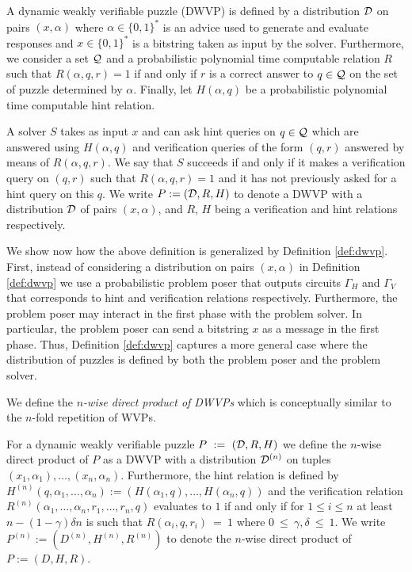 \begin{definition}
  \label{def:dwvp_dodis}
  A \textnormal{dynamic weakly verifiable puzzle} (DWVP) is defined by a distribution $\mathcal{D}$ on pairs $(x, \alpha)$
  where $\alpha \in \{0,1\}^{*}$ is an advice used to generate and evaluate responses and $x \in \{0,1\}^{*}$ is
  a bitstring taken as input by the solver.
  Furthermore, we consider a set $\mathcal{Q}$ and a probabilistic polynomial time computable relation $R$ such that
  $R(\alpha, q, r) = 1$ if and only if $r$ is a correct answer to $q \in \mathcal{Q}$ on the set of puzzle determined by $\alpha$.
  Finally, let $H(\alpha, q)$ be a probabilistic polynomial time computable \textnormal{hint} relation.

  A solver $S$ takes as input $x$ and can ask hint queries on $q \in \mathcal{Q}$ which are answered using $H(\alpha, q)$ and verification
  queries of the form $(q,r)$ answered by means of $R(\alpha, q, r)$.
  We say that $S$ succeeds if and only if it makes a verification query on $(q,r)$ such that
  $R(\alpha,q,r) = 1$ and it
  has not previously asked for a hint query on this $q$. We write $P := (\mathcal{D}, R, H)$ to denote a DWVP with a distribution
  $\mathcal{D}$ of pairs $(x, \alpha)$, and $R$, $H$ being a verification and hint relations respectively.
\end{definition}
%
We show now how the above definition is generalized by Definition \ref{def:dwvp}.
First, instead of considering a distribution on pairs $(x,\alpha)$ in Definition \ref{def:dwvp}
we use a probabilistic problem poser that outputs circuits $\Gamma_H$ and $\Gamma_V$ that corresponds to hint
and verification relations respectively.
Furthermore, the problem poser may interact in the first phase with the problem solver.
In particular, the problem poser can send a bitstring $x$ as a message in the first phase.
Thus, Definition \ref{def:dwvp} captures a more general case where the distribution of
puzzles is defined by both the problem poser and the problem solver.

We define the \textit{$n$-wise direct product of DWVPs} which is conceptually similar to the $n$-fold repetition of WVPs.
%
\begin{definition}
For a dynamic weakly verifiable puzzle $P~:=~(\mathcal{D}, R, H)$ we define the $n$-wise direct product of $P$
as a DWVP with a distribution $\mathcal{D}^{(n)}$ on tuples $(x_1, \alpha_1), \dotsc, (x_n, \alpha_n)$.
Furthermore, the hint relation is defined by $H^{(n)}(q, \alpha_1, \dotsc, \alpha_n) := (H(\alpha_1, q), \dotsc, H(\alpha_n, q))$ and
the verification relation $R^{(n)}(\alpha_1, \dotsc, \alpha_n, r_1, \dotsc, r_n, q)$ evaluates to $1$ if and only if
for $1\!\leq\!i\!\leq\!n$ at least $n - (1 - \gamma)\delta n$ is such that $R(\alpha_i, q, r_i)~=~1$ where $0~\leq~\gamma,\delta~\leq~1$.
%
We write $P^{(n)} := (D^{(n)}, H^{(n)}, R^{(n)})$ to denote the $n$-wise direct product of $P := (D,H,R)$.
%
\end{definition}

